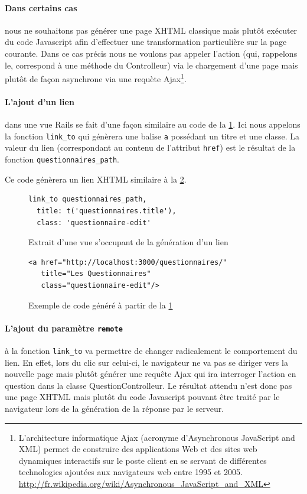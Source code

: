\documentclass[12pt,a4paper]{book}
\begin{document}
\paragraph{Dans certains cas} nous ne souhaitons pas générer une page XHTML classique mais plutôt exécuter du code Javascript afin d'effectuer une transformation particulière sur la page courante. Dans ce cas précis nous ne voulons pas appeler l'action (qui, rappelons le, correspond à une méthode du Controlleur) via le chargement d'une page mais plutôt de façon asynchrone via une requète Ajax\footnote{L'architecture informatique Ajax (acronyme d'Asynchronous JavaScript and XML) permet de construire des applications Web et des sites web dynamiques interactifs sur le poste client en se servant de différentes technologies ajoutées aux navigateurs web entre 1995 et 2005. \url{http://fr.wikipedia.org/wiki/Asynchronous_JavaScript_and_XML}}. 

\paragraph{L'ajout d'un lien} dans une vue Rails se fait d'une façon similaire au code de la \cref{fig.link}. Ici nous appelons la fonction \texttt{link\_to} qui génèrera une balise \texttt{a} possédant un titre et une classe. La valeur du lien (correspondant au contenu de l'attribut \texttt{href}) est le résultat de la fonction \texttt{questionnaires\_path}.

Ce code génèrera un lien XHTML similaire à la \cref{fig.link2}.

\begin{figure}[h]
\lstset{language=ruby}
\begin{lstlisting}
link_to questionnaires_path, 
  title: t('questionnaires.title'), 
  class: 'questionnaire-edit'
\end{lstlisting}
 \caption{Extrait d'une vue s'occupant de la génération d'un lien}
 \label{fig.link}
\end{figure}

\begin{figure}[h]
\lstset{language=xml}
\begin{lstlisting}
<a href="http://localhost:3000/questionnaires/" 
   title="Les Questionnaires" 
   class="questionnaire-edit"/>
\end{lstlisting}
 \caption{Exemple de code généré à partir de la \cref{fig.link}}
 \label{fig.link2}
\end{figure}

\paragraph{L'ajout du paramètre \texttt{remote}} à la fonction \texttt{link\_to} va permettre de changer radicalement le comportement du lien. En effet, lors du clic sur celui-ci, le navigateur ne va pas se diriger vers la nouvelle page mais plutôt générer une requête Ajax qui ira interroger l'action en question dans la classe QuestionControlleur. Le résultat attendu n'est donc pas une page XHTML mais plutôt du code Javascript pouvant être traité par le navigateur lors de la génération de la réponse par le serveur.
\end{document}
